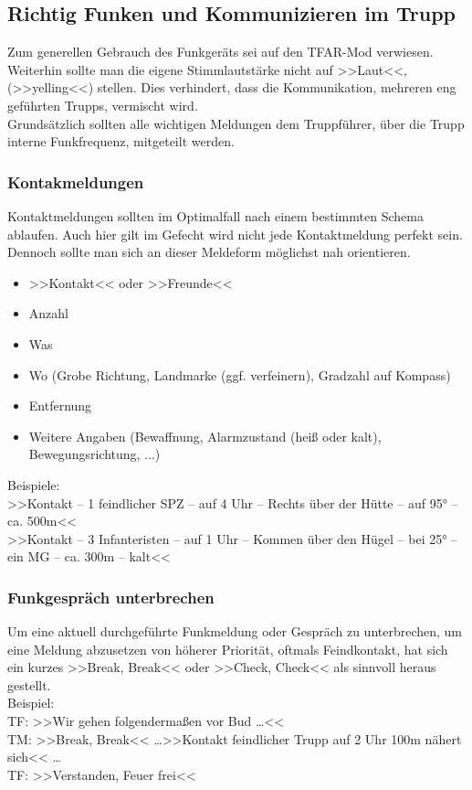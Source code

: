\subsection{Richtig Funken und Kommunizieren im Trupp}
	Zum generellen Gebrauch des Funkgeräts sei auf den TFAR-Mod verwiesen. Weiterhin sollte man die eigene Stimmlautstärke nicht auf >>Laut<<, (>>yelling<<) stellen. Dies verhindert, dass die Kommunikation, mehreren eng geführten Trupps, vermischt wird.\\
	Grundsätzlich sollten alle wichtigen Meldungen dem Truppführer, über die Trupp interne Funkfrequenz, mitgeteilt werden.
 
\subsubsection{Kontakmeldungen}
	Kontaktmeldungen sollten im Optimalfall nach einem bestimmten Schema ablaufen. Auch hier gilt im Gefecht wird nicht jede Kontaktmeldung perfekt sein. Dennoch sollte man sich an dieser Meldeform möglichst nah orientieren.
	\begin{itemize}
		\setlength{\itemsep}{-4pt}
		\itemsep-4pt
		\item >>Kontakt<< oder >>Freunde<<
		\item Anzahl 
		\item Was
		\item Wo (Grobe Richtung, Landmarke (ggf. verfeinern), Gradzahl auf Kompass) 
		\item Entfernung
		\item Weitere Angaben (Bewaffnung, Alarmzustand (heiß oder kalt), Bewegungsrichtung, ...)
	\end{itemize}

	Beispiele:\\
	>>Kontakt -- 1 feindlicher \acs{SPZ} -- auf 4 Uhr -- Rechts über der Hütte -- auf 95° -- ca. 500m<< \\
	>>Kontakt -- 3 Infanteristen -- auf 1 Uhr -- Kommen über den Hügel -- bei 25° -- ein \acs{MG} -- ca. 300m -- kalt<<

\subsubsection{Funkgespräch unterbrechen}
	Um eine aktuell durchgeführte Funkmeldung oder Gespräch zu unterbrechen, um eine Meldung abzusetzen von höherer Priorität, oftmals Feindkontakt, hat sich ein kurzes >>Break, Break<< oder >>Check, Check<< als sinnvoll heraus gestellt.\\
	Beispiel: \\
	TF: >>Wir gehen folgendermaßen vor Bud \dots<<\\
	TM: >>Break, Break<< \dots >>Kontakt feindlicher Trupp auf 2 Uhr  100m nähert sich<< \dots\\
	TF: >>Verstanden, Feuer frei<<


